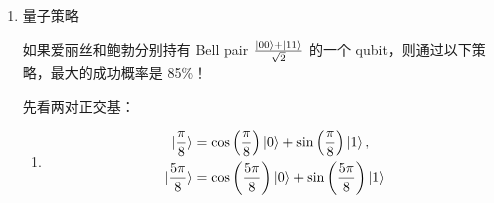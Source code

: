 \begin{enumerate}
\begin{itemize}
		\item \textbf{Strategy: Same as Input}
		\begin{itemize}
			\item $(x, y) = (0, 0) \Rightarrow (a, b) = (0, 0) \Rightarrow a + b = 0, \; xy = 0$
			\item $(x, y) = (0, 1) \Rightarrow (a, b) = (0, 1) \Rightarrow \textcolor{flameorange}{a + b = 1} vs. \textcolor{flameorange}{xy = 0} $
			\item $(x, y) = (1, 0) \Rightarrow (a, b) = (1, 0) \Rightarrow \textcolor{flameorange}{a + b = 1} vs. \textcolor{flameorange}{xy = 0}$
			\item $(x, y) = (1, 1) \Rightarrow (a, b) = (1, 1) \Rightarrow \textcolor{flameorange}{a + b = 0} vs. \textcolor{flameorange}{xy = 1}$
		\end{itemize}
		
		\item \textbf{Strategy: Opposite of Input}
		\begin{itemize}
			\item $(x, y) = (0, 0) \Rightarrow (a, b) = (1, 1) \Rightarrow a + b = 0, \; xy = 0$
			\item $(x, y) = (0, 1) \Rightarrow (a, b) = (1, 0) \Rightarrow \textcolor{flameorange}{a + b = 1} vs. \textcolor{flameorange}{xy = 0}$
			\item $(x, y) = (1, 0) \Rightarrow (a, b) = (0, 1) \Rightarrow \textcolor{flameorange}{a + b = 1} vs. \textcolor{flameorange}{xy = 0}$
			\item $(x, y) = (1, 1) \Rightarrow (a, b) = (0, 0) \Rightarrow \textcolor{flameorange}{a + b = 0} vs. \textcolor{flameorange}{xy = 1}$
		\end{itemize}
	\end{itemize}
	
	\textbf{不确定策略是所有确定策略的凸组合}，因此由上述确定策略即可得经典策略最大胜率为75\%。
	
	\item 量子策略
	
	如果爱丽丝和鲍勃分别持有 Bell pair $\frac{\ket{00} + \ket{11}}{\sqrt{2}}$ 的一个 qubit，则通过以下策略，最大的成功概率是 85\%！
	
	先看两对正交基：
	\begin{enumerate}
		\item 
		\[
		\begin{aligned}
			\ket{\frac{\pi}{8}} &= \cos\left(\frac{\pi}{8}\right)\ket{0} + \sin\left(\frac{\pi}{8}\right)\ket{1}, \\
			\ket{\frac{5\pi}{8}} &= \cos\left(\frac{5\pi}{8}\right)\ket{0} + \sin\left(\frac{5\pi}{8}\right)\ket{1}
		\end{aligned}
		\]
		

\end{enumerate}
\end{enumerate}

